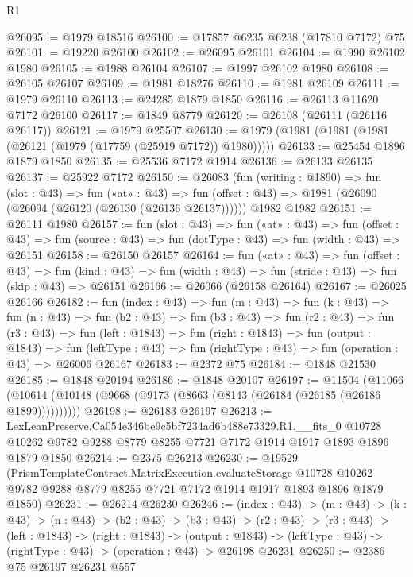 \begin{lexlean}{R1}
\begin{coremodule}
@26095 := @1979 @18516
@26100 := @17857 @6235 @6238 (@17810 @7172) @75
@26101 := @19220 @26100
@26102 := @26095 @26101
@26104 := @1990 @26102 @1980
@26105 := @1988 @26104
@26107 := @1997 @26102 @1980
@26108 := @26105 @26107
@26109 := @1981 @18276
@26110 := @1981 @26109
@26111 := @1979 @26110
@26113 := @24285 @1879 @1850
@26116 := @26113 @11620 @7172 @26100
@26117 := @1849 @8779
@26120 := @26108 (@26111 (@26116 @26117))
@26121 := @1979 @25507
@26130 := @1979 (@1981 (@1981 (@1981 (@26121 (@1979 (@17759 (@25919 @7172)) @1980)))))
@26133 := @25454 @1896 @1879 @1850
@26135 := @25536 @7172 @1914
@26136 := @26133 @26135
@26137 := @25922 @7172
@26150 := @26083
    (fun (writing : @1890) =>
    fun (slot : @43) =>
    fun («at» : @43) =>
    fun (offset : @43) => @1981 (@26090 (@26094 (@26120 (@26130 (@26136 @26137))))))
    @1982
    @1982
@26151 := @26111 @1980
@26157 := fun (slot : @43) =>
  fun («at» : @43) =>
  fun (offset : @43) => fun (source : @43) => fun (dotType : @43) => fun (width : @43) => @26151
@26158 := @26150 @26157
@26164 := fun («at» : @43) =>
  fun (offset : @43) =>
  fun (kind : @43) => fun (width : @43) => fun (stride : @43) => fun (skip : @43) => @26151
@26166 := @26066 (@26158 @26164)
@26167 := @26025 @26166
@26182 := fun (index : @43) =>
  fun (m : @43) =>
  fun (k : @43) =>
  fun (n : @43) =>
  fun (b2 : @43) =>
  fun (b3 : @43) =>
  fun (r2 : @43) =>
  fun (r3 : @43) =>
  fun (left : @1843) =>
  fun (right : @1843) =>
  fun (output : @1843) =>
  fun (leftType : @43) => fun (rightType : @43) => fun (operation : @43) => @26006 @26167
@26183 := @2372 @75
@26184 := @1848 @21530
@26185 := @1848 @20194
@26186 := @1848 @20107
@26197 := @11504
    (@11066 (@10614 (@10148 (@9668 (@9173 (@8663 (@8143 (@26184 (@26185 (@26186 @1899))))))))))
@26198 := @26183 @26197
@26213 := LexLeanPreserve.Ca054e346be9c5bf7234ad6b488e73329.R1.__fits_0
    @10728
    @10262
    @9782
    @9288
    @8779
    @8255
    @7721
    @7172
    @1914
    @1917
    @1893
    @1896
    @1879
    @1850
@26214 := @2375 @26213
@26230 := @19529
    (PrismTemplateContract.MatrixExecution.evaluateStorage
      @10728
      @10262
      @9782
      @9288
      @8779
      @8255
      @7721
      @7172
      @1914
      @1917
      @1893
      @1896
      @1879
      @1850)
@26231 := @26214 @26230
@26246 := (index : @43) ->
  (m : @43) ->
  (k : @43) ->
  (n : @43) ->
  (b2 : @43) ->
  (b3 : @43) ->
  (r2 : @43) ->
  (r3 : @43) ->
  (left : @1843) ->
  (right : @1843) ->
  (output : @1843) -> (leftType : @43) -> (rightType : @43) -> (operation : @43) -> @26198 @26231
@26250 := @2386 @75 @26197 @26231 @557

\end{coremodule}
\end{lexlean}
